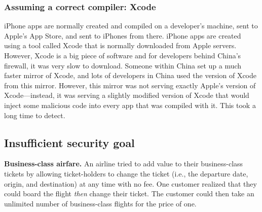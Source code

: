 \documentclass[
  letterpaper,
]{scrbook}
\theoremstyle{definition}
\theoremstyle{plain}
\theoremstyle{plain}
\theoremstyle{remark}
\begin{document}

\subsubsection{Assuming a correct compiler:
Xcode}\label{sec-intro-xcode}


iPhone apps are normally created and compiled on a developer's machine,
sent to Apple's App Store, and sent to iPhones from there. iPhone apps
are created using a tool called Xcode that is normally downloaded from
Apple servers. However, Xcode is a big piece of software and for
developers behind China's firewall, it was very slow to download.
Someone within China set up a much faster mirror of Xcode, and lots of
developers in China used the version of Xcode from this mirror. However,
this mirror was not serving exactly Apple's version of Xcode---instead,
it was serving a slightly modified version of Xcode that would inject
some malicious code into every app that was compiled with it. This took
a long time to detect.


\subsection{Insufficient security
goal}\label{insufficient-security-goal}

\textbf{Business-class airfare.} An airline tried to add value to their
business-class tickets by allowing ticket-holders to change the ticket
(i.e., the departure date, origin, and destination) at any time with no
fee. One customer realized that they could board the flight \emph{then}
change their ticket. The customer could then take an unlimited number of
business-class flights for the price of one.
\end{document}
